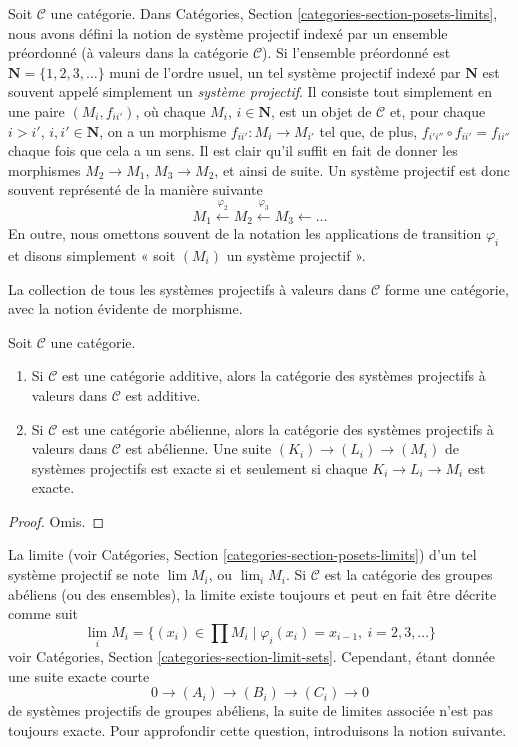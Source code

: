 \noindent
Soit $\mathcal{C}$ une catégorie.
Dans Catégories, Section \ref{categories-section-posets-limits},
nous avons défini la notion de système projectif indexé par un ensemble
préordonné (à valeurs dans la catégorie $\mathcal{C}$).
Si l'ensemble préordonné est $\mathbf{N} = \{1, 2, 3, \ldots\}$
muni de l'ordre usuel, un tel système projectif indexé par $\mathbf{N}$
est souvent appelé simplement un {\it système projectif}. Il consiste tout
simplement en une paire $(M_i, f_{ii'})$, où chaque $M_i$,
$i \in \mathbf{N}$, est un objet de $\mathcal{C}$ et, pour chaque
$i > i'$, $i, i' \in \mathbf{N}$, on a un morphisme
$f_{ii'} : M_i \to M_{i'}$ tel que, de plus,
$f_{i'i''} \circ f_{ii'} = f_{ii''}$ chaque fois que cela a un sens.
Il est clair qu'il suffit en fait de donner les morphismes
$M_2 \to M_1$, $M_3 \to M_2$, et ainsi de suite. Un système projectif
est donc souvent représenté de la manière suivante
$$
M_1 \xleftarrow{\varphi_2} M_2 \xleftarrow{\varphi_3} M_3 \leftarrow \ldots
$$
En outre, nous omettons souvent de la notation les applications de transition
$\varphi_i$ et disons simplement « soit $(M_i)$ un système projectif ».

\medskip\noindent
La collection de tous les systèmes projectifs à valeurs dans
$\mathcal{C}$ forme une catégorie, avec la notion évidente de morphisme.

\begin{lemma}
\label{lemma-inverse-systems-abelian}
Soit $\mathcal{C}$ une catégorie.
\begin{enumerate}
\item Si $\mathcal{C}$ est une catégorie additive, alors la catégorie
des systèmes projectifs à valeurs dans $\mathcal{C}$ est additive.
\item Si $\mathcal{C}$ est une catégorie abélienne, alors la catégorie
des systèmes projectifs à valeurs dans $\mathcal{C}$ est abélienne.
Une suite $(K_i) \to (L_i) \to (M_i)$ de systèmes projectifs
est exacte si et seulement si chaque $K_i \to L_i \to M_i$ est exacte.
\end{enumerate}
\end{lemma}

\begin{proof}
Omis.
\end{proof}

\noindent
La limite (voir Catégories, Section \ref{categories-section-posets-limits})
d'un tel système projectif se note $\lim M_i$, ou $\lim_i M_i$.
Si $\mathcal{C}$ est la catégorie des groupes abéliens (ou des ensembles),
la limite existe toujours et peut en fait être décrite comme suit
$$
\lim_i M_i
=
\{(x_i) \in \prod M_i \mid \varphi_i(x_i) = x_{i - 1}, \ i = 2, 3, \ldots\}
$$
voir Catégories, Section \ref{categories-section-limit-sets}.
Cependant, étant donnée une suite exacte courte
$$
0 \to (A_i) \to (B_i) \to (C_i) \to 0
$$
de systèmes projectifs de groupes abéliens, la suite de limites associée
n'est pas toujours exacte. Pour approfondir cette question, introduisons
la notion suivante.

